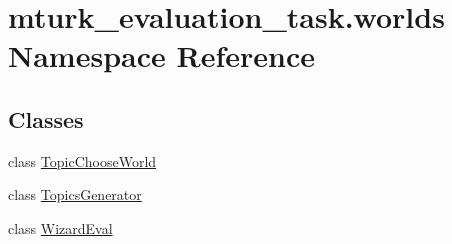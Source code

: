 \hypertarget{namespacemturk__evaluation__task_1_1worlds}{}\section{mturk\+\_\+evaluation\+\_\+task.\+worlds Namespace Reference}
\label{namespacemturk__evaluation__task_1_1worlds}
\subsection*{Classes}
\begin{DoxyCompactItemize}
\item 
class \hyperlink{classmturk__evaluation__task_1_1worlds_1_1TopicChooseWorld}{Topic\+Choose\+World}
\item 
class \hyperlink{classmturk__evaluation__task_1_1worlds_1_1TopicsGenerator}{Topics\+Generator}
\item 
class \hyperlink{classmturk__evaluation__task_1_1worlds_1_1WizardEval}{Wizard\+Eval}
\end{DoxyCompactItemize}
